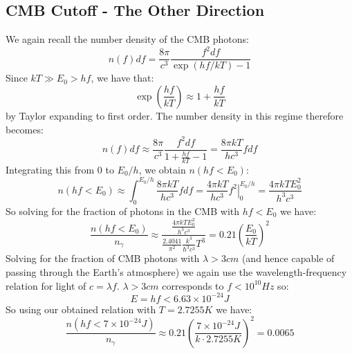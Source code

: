 \subsection{CMB Cutoff - The Other Direction}
We again recall the number density of the CMB photons:
\begin{equation}
  n(f)df = \frac{8\pi}{c^3}\frac{f^2df}{\exp(hf/kT) - 1}
\end{equation}
Since $kT \gg E_0 > hf$, we have that:
\begin{equation}
  \exp(\frac{hf}{kT}) \approx 1 + \frac{hf}{kT}
\end{equation}
by Taylor expanding to first order. The number density in this regime therefore becomes:
\begin{equation}
  n(f)df \approx \frac{8\pi}{c^3}\frac{f^2df}{1 + \frac{hf}{kT} - 1} = \frac{8\pi k T}{hc^3}fdf
\end{equation}
Integrating this from $0$ to $E_0/h$, we obtain $n(hf < E_0)$:
\begin{equation}
  n(hf < E_0) \approx \int_{0}^{E_0/h}\frac{8\pi k T}{hc^3}fdf = \frac{4\pi kT}{hc^3}\left. f^2\right|_0^{E_0/h} = \frac{4\pi kTE_0^2}{h^3c^3}
\end{equation}
So solving for the fraction of photons in the CMB with $hf < E_0$ we have:
\begin{equation}
  \boxed{\frac{n(hf < E_0)}{n_\gamma} \approx \frac{\frac{4\pi kTE_0^2}{h^3c^3}}{\frac{2.4041}{\pi^2}\frac{k^3}{\hbar^3c^3}T^3} = 0.21\left(\frac{E_0}{kT}\right)^2}
\end{equation}
Solving for the fraction of CMB photons with $\lambda > 3\si{cm}$ (and hence capable of passing through the Earth's atmosphere) we again use the wavelength-frequency relation for light of $c = \lambda f$. $\lambda > 3\si{cm}$ corresponds to $f < 10^{10}\si{Hz}$ so:
\begin{equation}
  E = hf < 6.63 \times 10^{-24}\si{J}
\end{equation}
So using our obtained relation with $T = 2.7255\si{K}$ we have:
\begin{equation}
  \boxed{\frac{n(hf < 7 \times 10^{-24}\si{J})}{n_\gamma} \approx  0.21\left(\frac{7 \times 10^{-24}\si{J}}{k\cdot 2.7255\si{K}}\right)^2 = 0.0065}
\end{equation}